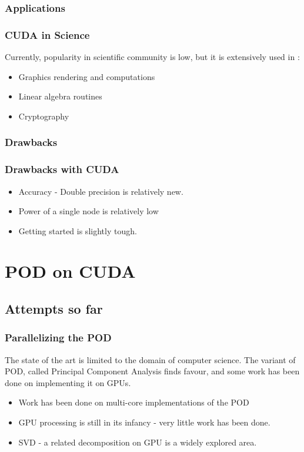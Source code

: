 \documentclass{beamer}
\begin{document}
\subsubsection{Applications}

\begin{frame}
\frametitle{CUDA in Science}
Currently, popularity in scientific community is low, but it is extensively used in : 
\begin{itemize}
\item
Graphics rendering and computations
\item
Linear algebra routines
\item
Cryptography
\end{itemize}
\end{frame}

\subsubsection{Drawbacks}
\begin{frame}
\frametitle{Drawbacks with CUDA}
\begin{itemize}
\item
Accuracy - Double precision is relatively new.
\item
Power of a single node is relatively low
\item
Getting started is slightly tough.
\end{itemize}
\end{frame}

\section{POD on CUDA}
\subsection{Attempts so far}
\begin{frame}
\frametitle{Parallelizing the POD}

The state of the art is limited to the domain of computer science. The variant of POD, called Principal Component Analysis finds favour, and some work has been done on implementing it on GPUs.
\begin{itemize}
\item
Work has been done on multi-core implementations of the POD
\item
GPU processing is still in its infancy - very little work has been done.
\item
SVD - a related decomposition on GPU is a widely explored area.
\end{itemize}
\end{frame}
\end{document}
